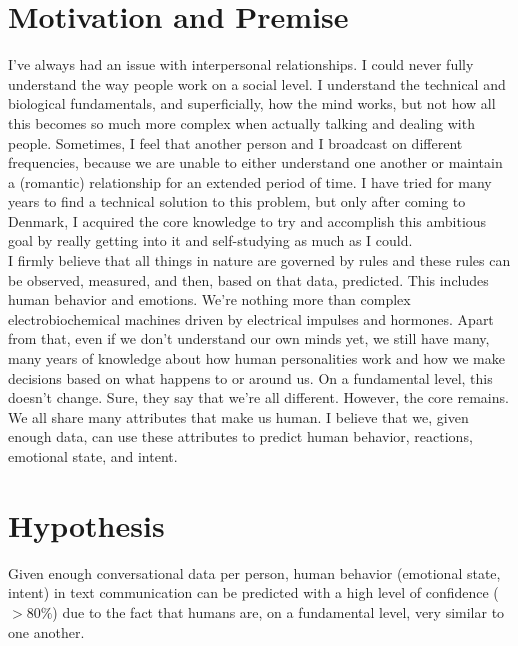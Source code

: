 \documentclass{article}
\begin{document}
\section{Motivation and Premise}
I've always had an issue with interpersonal relationships. I could never fully understand the way people work on a social level. I understand the technical and biological fundamentals, and superficially, how the mind works, but not how all this becomes so much more complex when actually talking and dealing with people. Sometimes, I feel that another person and I broadcast on different frequencies, because we are unable to either understand one another or maintain a (romantic) relationship for an extended period of time. I have tried for many years to find a technical solution to this problem, but only after coming to Denmark, I acquired the core knowledge to try and accomplish this ambitious goal by really getting into it and self-studying as much as I could.\\
I firmly believe that all things in nature are governed by rules and these rules can be observed, measured, and then, based on that data, predicted. This includes human behavior and emotions. We’re nothing more than complex electrobiochemical machines driven by electrical impulses and hormones. Apart from that, even if we don’t understand our own minds yet, we still have many, many years of knowledge about how human personalities work and how we make decisions based on what happens to or around us. On a fundamental level, this doesn’t change. Sure, they say that we’re all different. However, the core remains. We all share many attributes that make us human. I believe that we, given enough data, can use these attributes to predict human behavior, reactions, emotional state, and intent.

\section{Hypothesis}
Given enough conversational data per person, human behavior (emotional state, intent) in text communication can be predicted with a high level of confidence ($>80\%$) due to the fact that humans are, on a fundamental level, very similar to one another.

\end{document}
